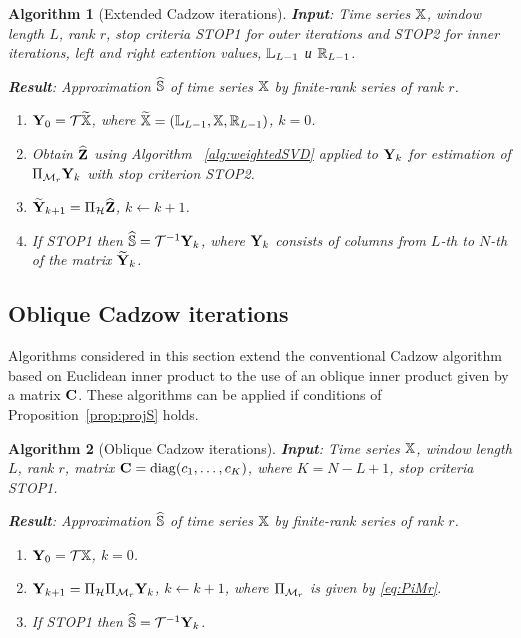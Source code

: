 \documentclass[sii]{ipart}
\newtheorem{algorithm}{Algorithm}
\newtheorem{remark}{Remark}
\begin{document}
\begin{algorithm}[Extended Cadzow iterations]\label{alg:ECIt}
	\textbf{Input}: Time series $\mathbb{X}$, window length $L$, rank $r$,
	stop criteria STOP1 for outer iterations and STOP2 for inner iterations,
	left and right extention values, $\mathbb{L}_{L-1}$ и $\mathbb{R}_{L-1}$.
	
	\textbf{Result}:
	Approximation $\widehat{\mathbb{S}}$ of time series $\mathbb{X}$ by finite-rank series of rank $r$.
	
	\begin{enumerate}
		\item
		$\mathbf{Y}_0 = \mathcal{T} \widetilde{\mathbb{X}}$, where $\widetilde{\mathbb{X}}=(\mathbb{L}_{L-1}, \mathbb{X}, \mathbb{R}_{L-1})$, $k=0$.
		\item
		Obtain $\widehat{\mathbf{Z}}$ using Algorithm ~\ref{alg:weightedSVD} applied to $\mathbf{Y}_k$ for estimation of $\Pi_{\mathcal{M}_r} \mathbf{Y}_{k}$ with stop criterion STOP2.
		\item
		$\widetilde{\mathbf{Y}}_{k+1} = \Pi_{\mathcal{H}}  \widehat{\mathbf{Z}}$, $k\leftarrow k+1$.
		\item
		If STOP1 then $\widehat{\mathbb{S}} = \mathcal{T}^{-1} \mathbf{Y}_k$, where $\mathbf{Y}_k$ consists of columns from $L$-th to $N$-th of the matrix $\widetilde{\mathbf{Y}}_{k}$.
	\end{enumerate}
\end{algorithm}


\subsection{Oblique Cadzow iterations}

Algorithms considered in this section extend the conventional Cadzow algorithm based on Euclidean inner product to the use of an oblique inner product given by a matrix $\mathbf{C}$.
These algorithms can be applied if conditions of Proposition~\ref{prop:projS} holds.

\begin{algorithm}[Oblique Cadzow iterations]
	\label{alg:obliqueCadzow}
	\textbf{Input}: Time series $\mathbb{X}$, window length $L$, rank $r$, matrix $\mathbf{C}=\mathop{\mathrm{diag}}(c_1,\ldots, c_K)$, where $K=N-L+1$,
	stop criteria STOP1.
	
	\textbf{Result}:
	Approximation $\widehat{\mathbb{S}}$ of time series $\mathbb{X}$ by finite-rank series of rank $r$.
	
	\begin{enumerate}
		\item
		$\mathbf{Y}_0 = \mathcal{T} \mathbb{X}$, $k=0$.
		\item
		$\mathbf{Y}_{k+1} = \Pi_{\mathcal{H}}  \Pi_{\mathcal{M}_r} \mathbf{Y}_{k}$, $k\leftarrow k+1$, where
		$\Pi_{\mathcal{M}_r}$ is given by \eqref{eq:PiMr}.
		\item
		If STOP1 then $\widehat{\mathbb{S}} = \mathcal{T}^{-1} \mathbf{Y}_k$.
	\end{enumerate}
\end{algorithm}
\end{document}

